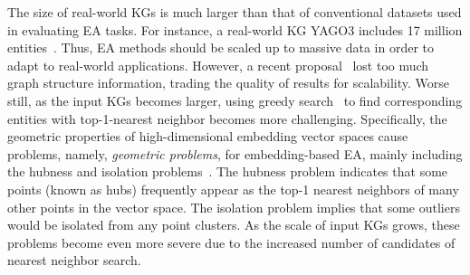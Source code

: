 The size of real-world KGs is much larger than that of conventional datasets used in evaluating EA tasks.
For instance, a real-world KG YAGO3 includes 17 million entities~\cite{LargeEA22}. Thus, EA methods should be scaled up to massive data in order to adapt to real-world applications. However, a recent proposal~\cite{LargeEA22} 
lost too much graph structure information, trading the quality of results for scalability.
Worse still, as the input KGs becomes larger, using greedy search~\cite{OpenEA2020VLDB} to find corresponding entities  with top-1-nearest neighbor becomes more challenging. 
% 
Specifically, the geometric properties of high-dimensional embedding vector spaces cause problems, namely, \emph{geometric problems}, for embedding-based EA, mainly including the hubness and isolation problems~\cite{OpenEA2020VLDB}.
The hubness problem indicates that some points (known as hubs) frequently appear as the top-1 nearest neighbors of many other points in the vector space.
The isolation problem implies that some outliers would be isolated from any point clusters. As the scale of input KGs grows, these problems become even more severe due to the increased number of candidates of nearest neighbor search. 

